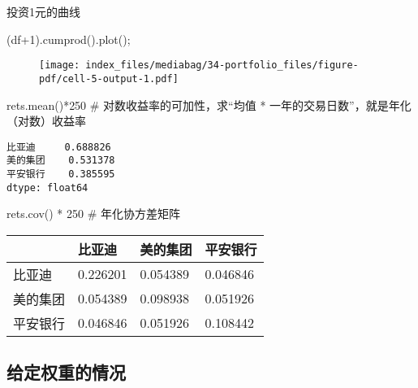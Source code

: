 \documentclass[
  letterpaper,
  DIV=11,
  numbers=noendperiod]{scrreprt}
\newenvironment{Shaded}{\begin{snugshade}}{\end{snugshade}}
\newcommand{\CommentTok}[1]{\textcolor[rgb]{0.37,0.37,0.37}{#1}}
\newcommand{\DecValTok}[1]{\textcolor[rgb]{0.68,0.00,0.00}{#1}}
\newcommand{\NormalTok}[1]{\textcolor[rgb]{0.00,0.23,0.31}{#1}}
\newcommand{\OperatorTok}[1]{\textcolor[rgb]{0.37,0.37,0.37}{#1}}
\begin{document}
投资1元的曲线

\begin{Shaded}
\begin{Highlighting}[]
\NormalTok{(df}\OperatorTok{+}\DecValTok{1}\NormalTok{).cumprod().plot()}\OperatorTok{;}
\end{Highlighting}
\end{Shaded}

\begin{figure}[H]

{\centering \texttt{[image: index\_files/mediabag/34-portfolio\_files/figure-pdf/cell-5-output-1.pdf]}

}

\end{figure}

\begin{Shaded}
\begin{Highlighting}[]
\NormalTok{rets.mean()}\OperatorTok{*}\DecValTok{250} \CommentTok{\# 对数收益率的可加性，求“均值 * 一年的交易日数”，就是年化（对数）收益率}
\end{Highlighting}
\end{Shaded}

\begin{verbatim}
比亚迪     0.688826
美的集团    0.531378
平安银行    0.385595
dtype: float64
\end{verbatim}

\begin{Shaded}
\begin{Highlighting}[]
\NormalTok{rets.cov() }\OperatorTok{*} \DecValTok{250} \CommentTok{\# 年化协方差矩阵}
\end{Highlighting}
\end{Shaded}

\begin{longtable}[]{@{}llll@{}}
\toprule\noalign{}
& 比亚迪 & 美的集团 & 平安银行 \\
\midrule\noalign{}
\endhead
\bottomrule\noalign{}
\endlastfoot
比亚迪 & 0.226201 & 0.054389 & 0.046846 \\
美的集团 & 0.054389 & 0.098938 & 0.051926 \\
平安银行 & 0.046846 & 0.051926 & 0.108442 \\
\end{longtable}

\hypertarget{ux7ed9ux5b9aux6743ux91cdux7684ux60c5ux51b5}{%
\subsection{给定权重的情况}\label{ux7ed9ux5b9aux6743ux91cdux7684ux60c5ux51b5}}
\end{document}
